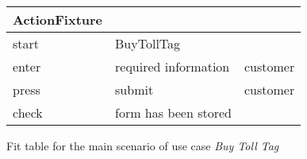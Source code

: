 
\begin{figure}
\centering
\begin{tabular}{|l|l|l|}
\hline 
ActionFixture &  & \tabularnewline
\hline 
start & BuyTollTag & \tabularnewline
\hline 
enter & required information & customer\tabularnewline
\hline 
press & submit & customer \tabularnewline
\hline 
check & form has been stored & \tabularnewline
\hline 
\end{tabular}
\caption{Fit table for the main scenario of use case \emph{Buy Toll Tag}}
\end{figure}
